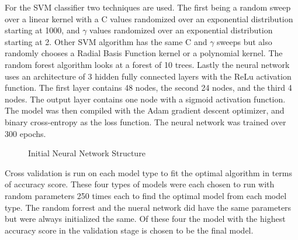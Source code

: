 \documentclass[12pt]{article}
\begin{document}
For the SVM classifier two techniques are used.  The first being a random sweep over a linear kernel with a C values randomized over an exponential distribution starting at 1000, and $\gamma$ values randomized over an exponential distribution starting at 2.  Other SVM algorithm has the same C and $\gamma$ sweeps but also randomly chooses a Radial Basis Function kernel or a polynomial kernel.  The random forest algorithm looks at a forest of 10 trees. Lastly the neural network uses an architecture of 3 hidden fully connected layers with the ReLu activation function.  The first layer contains 48 nodes, the second 24 nodes, and the third 4 nodes. The output layer contains one node with a sigmoid activation function.  The model was then compiled with the Adam gradient descent optimizer, and binary cross-entropy as the loss function.  The neural network was trained over 300 epochs.
\begin{figure}[H]
\caption{Initial Neural Network Structure}
\end{figure}
Cross validation is run on each model type to fit the optimal algorithm in terms of accuracy score. These four types of models were each chosen to run with random parameters 250 times each to find the optimal model from each model type. The random forrest and the nueral network did have the same parameters but were always initialized the same.   Of these four the model with the highest accuracy score in the validation stage is chosen to be the final model.
\end{document}
